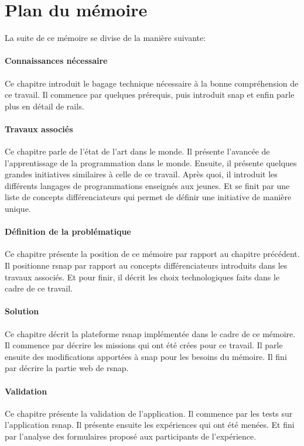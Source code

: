 \section{Plan du mémoire}
La suite de ce mémoire se divise de la manière suivante:

\paragraph{Connaissances nécessaire}
Ce chapitre introduit le bagage technique nécessaire à la bonne compréhension de ce travail. Il commence par quelques prérequis, puis introduit \gls{snap} et enfin parle plus en détail de \gls{rails}.

\paragraph{Travaux associés}
Ce chapitre parle de l'état de l'art dans le monde. Il présente l'avancée de l'apprentissage de la programmation dans le monde. Ensuite, il présente quelques grandes initiatives similaires à celle de ce travail. Après quoi, il introduit les différents langages de programmations enseignés aux jeunes. Et se finit par une liste de concepts différenciateurs qui permet de définir une initiative de manière unique.

\paragraph{Définition de la problématique}
Ce chapitre présente la position de ce mémoire par rapport au chapitre précédent. Il positionne \gls{rsnap} par rapport au concepts différenciateurs introduits dans les travaux associés. Et pour finir, il décrit les choix technologiques faits dans le cadre de ce travail.

\paragraph{Solution}
Ce chapitre décrit la plateforme \gls{rsnap} implémentée dans le cadre de ce mémoire.
Il commence par décrire les \glspl{mission} qui ont été crées pour ce travail. Il parle ensuite des modifications apportées à \gls{snap} pour les besoins du mémoire. Il fini par décrire la partie web de \gls{rsnap}.

\paragraph{Validation}
Ce chapitre présente la validation de l'application. Il commence par les tests sur l'application \gls{rsnap}. Il présente ensuite les expériences qui ont été menées. Et fini par l'analyse des formulaires proposé aux participants de l'expérience.

